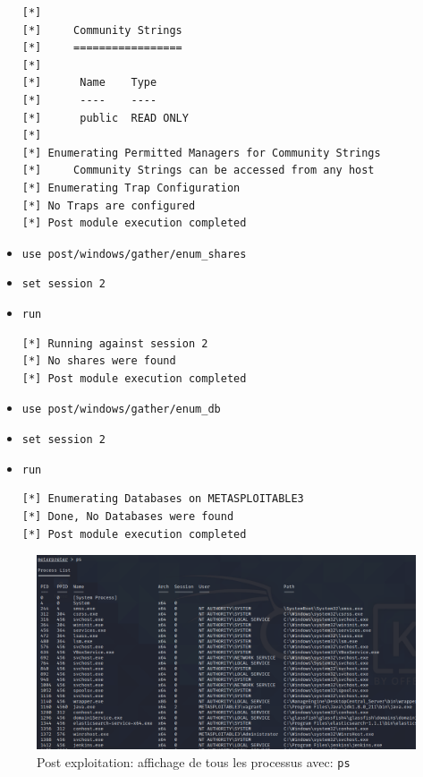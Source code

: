 \documentclass[a4paper]{article}
\begin{document}
\begin{itemize}
\begin{example}
\begin{Verbatim}[fontsize=\footnotesize]
[*] 
[*]     Community Strings
[*]     =================
[*] 
[*]      Name    Type
[*]      ----    ----
[*]      public  READ ONLY
[*] 
[*] Enumerating Permitted Managers for Community Strings
[*]     Community Strings can be accessed from any host
[*] Enumerating Trap Configuration
[*] No Traps are configured
[*] Post module execution completed
\end{Verbatim}
    \end{example}
    \item \texttt{\footnotesize use post/windows/gather/enum\_shares}
    \item \texttt{\footnotesize set session 2}
    \item \texttt{\footnotesize run}
    \begin{example}
\begin{Verbatim}[fontsize=\footnotesize]
[*] Running against session 2
[*] No shares were found
[*] Post module execution completed    
\end{Verbatim}
    \end{example}
    \item \texttt{\footnotesize use post/windows/gather/enum\_db}
    \item \texttt{\footnotesize set session 2}
    \item \texttt{\footnotesize run}
    \begin{example}
\begin{Verbatim}[fontsize=\footnotesize]
[*] Enumerating Databases on METASPLOITABLE3
[*] Done, No Databases were found
[*] Post module execution completed
\end{Verbatim}
    \end{example}
\end{itemize}

\begin{figure}[H]
    \centering
    \includegraphics[width=0.99\linewidth]{images/post-exploitation-ps.PNG}
    \caption{Post exploitation: affichage de tous les processus avec: \texttt{\footnotesize ps}}
    \label{fig:postPs}
\end{figure}
\end{document}
